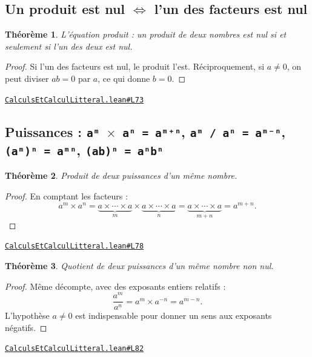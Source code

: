 \documentclass[11pt,a4paper]{article}
\theoremstyle{definition}
\theoremstyle{plain}
\newtheorem{theoreme}{Théorème}
\newcommand{\source}[2]{\par\smallskip\noindent\hfill{\footnotesize\href{#1}{\texttt{#2}}}\par\smallskip}
\begin{document}
\subsection{Un produit est nul \(\iff\) l'un des facteurs est nul}

\begin{theoreme}
L'équation produit : un produit de deux nombres est nul si et seulement si l'un des
deux est nul.
\end{theoreme}

\begin{proof}
Si l'un des facteurs est nul, le produit l'est. Réciproquement, si $a \ne 0$, on peut
diviser $ab = 0$ par $a$, ce qui donne $b = 0$.
\end{proof}
\source{https://github.com/Commutator-IO/learn-lean/blob/main/cours/01-college/01-nombres-et-calculs/CalculsEtCalculLitteral.lean\#L73}{CalculsEtCalculLitteral.lean\#L73}

\subsection{Puissances : \texttt{aᵐ \(\times\) aⁿ = aᵐ⁺ⁿ}, \texttt{aᵐ / aⁿ = aᵐ⁻ⁿ}, \texttt{(aᵐ)ⁿ = aᵐⁿ}, \texttt{(ab)ⁿ = aⁿbⁿ}}

\begin{theoreme}
Produit de deux puissances d'un même nombre.
\end{theoreme}

\begin{proof}
En comptant les facteurs :
\[
a^m \times a^n
  = \underbrace{a \times \cdots \times a}_{m}
    \times \underbrace{a \times \cdots \times a}_{n}
  = \underbrace{a \times \cdots \times a}_{m+n}
  = a^{m+n} .
\]
\end{proof}
\source{https://github.com/Commutator-IO/learn-lean/blob/main/cours/01-college/01-nombres-et-calculs/CalculsEtCalculLitteral.lean\#L78}{CalculsEtCalculLitteral.lean\#L78}

\begin{theoreme}
Quotient de deux puissances d'un même nombre non nul.
\end{theoreme}

\begin{proof}
Même décompte, avec des exposants entiers relatifs :
\[
\frac{a^m}{a^n} = a^m \times a^{-n} = a^{m-n} .
\]
L'hypothèse $a \ne 0$ est indispensable pour donner un sens aux exposants négatifs.
\end{proof}
\source{https://github.com/Commutator-IO/learn-lean/blob/main/cours/01-college/01-nombres-et-calculs/CalculsEtCalculLitteral.lean\#L82}{CalculsEtCalculLitteral.lean\#L82}
\end{document}
